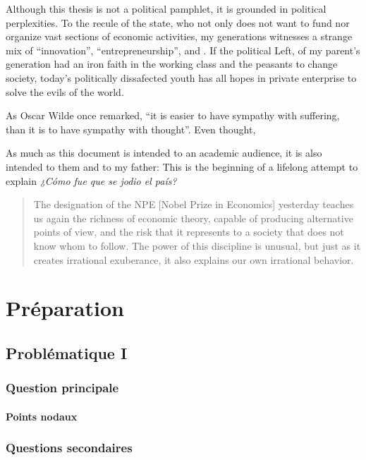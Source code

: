 \documentclass[paper=A4,portrait,twoside=true,twocolumn=false,headinclude=false,footinclude=false,fontsize=11,BCOR=15mm,DIV=calc,pagesize=auto,titlepage=firstiscover,mpinclude=true,headings=normal,headings=twolinechapter,open=right,chapterprefix=false,headsepline=false,parskip=full]{scrbook}
\begin{document}
Although this thesis is not a political pamphlet, it is grounded in
political perplexities. To the recule of the state, who not only does not
want to fund nor organize vast sections of economic activities, my
generations witnesses a strange mix of ``innovation'',
``entrepreneurship'', and . If the political Left, of my parent's
generation had an iron faith in the working class and the peasants to
change society, today's politically dissafected youth has all hopes in
private enterprise to solve the evils of the world.

As Oscar Wilde once remarked, ``it is easier to have sympathy with
suffering, than it is to have sympathy with thought''. Even thought,


As much as this document is intended to an academic audience, it is also
intended to them and to my father: This is the beginning of a lifelong
attempt to explain \emph{¿Cómo fue que se jodio el país?} 

\blockcquote{Alvarez2013}{The designation of the NPE [Nobel Prize in Economics] yesterday teaches us again the richness of economic theory, capable of producing  alternative points of view, and the risk that it represents to a society that does not know whom to follow. The power of this discipline is unusual, but just as it creates irrational exuberance, it also explains our own irrational behavior.}



\lipsum

\mainmatter
\pagestyle{scrheadings}
\part{Préparation}
\label{sec:org448fab4}
\chapter{Problématique I}
\label{sec:org56587f5}
\section{Question principale}
\label{sec:orgc3f558e}
\subsection{Points nodaux}
\label{sec:org6202cae}
\section{Questions secondaires}
\label{sec:orga50b751}
\end{document}
